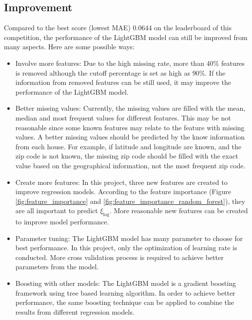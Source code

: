 \documentclass[12pt]{article}
\begin{document}
\subsection{Improvement}
Compared to the best score (lowest MAE) 0.0644 on the leaderboard of this competition, the performance of the LightGBM model can still be improved from many aspects. Here are some possible ways:

\begin{itemize}
	\item Involve more features: Due to the high missing rate, more than 40\% features is removed although the cutoff percentage is set as high as 90\%. If the information from removed features can be still used, it may improve the performance of the LightGBM model.  
\end{itemize}

\begin{itemize}
	\item Better missing values: Currently, the missing values are filled with the mean, median and most frequent values for different features. This may be not reasonable since some known features may relate to the feature with missing values. A better missing values should be predicted by the know information from each house. For example, if latitude and longitude are known, and the zip code is not known, the missing zip code should be filled with the exact value based on the geographical information, not the most frequent zip code.
\end{itemize}

\begin{itemize}
	\item Create more features: In this project, three new features are created to improve regression models. According to the feature importance (Figure \ref{fig:feature_importance} and \ref{fig:feature_importance_random_forest}), they are all important to predict $\xi_{\log}$. More reasonable new features can be created to improve model performance. 
\end{itemize}

\begin{itemize}
	\item Parameter tuning: The LightGBM model has many parameter to choose for best performance. In this project, only the optimization of learning rate is conducted. More cross validation process is required to achieve better parameters from the model.
\end{itemize}

\begin{itemize}
	\item Boosting with other models: The LightGBM model is a gradient boosting framework using tree based learning algorithm. In order to achieve better performance, the same boosting technique can be applied to combine the results from different regression models.
\end{itemize}
\end{document}
